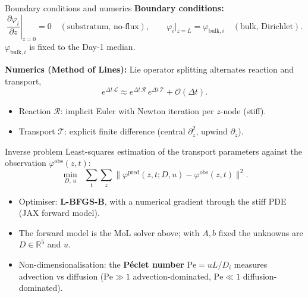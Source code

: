 \documentclass[
  ignorenonframetext,
  aspectratio=169,
]{beamer}
\providecommand{\tightlist}{%
  \setlength{\itemsep}{0pt}\setlength{\parskip}{0pt}}
\begin{document}
\begin{frame}{Boundary conditions and numerics}
\protect\hypertarget{boundary-conditions-and-numerics}{}
\textbf{Boundary conditions:}
\[\left.\frac{\partial \varphi_i}{\partial z}\right|_{z=0}=0\quad(\text{substratum, no-flux}),\qquad
\varphi_i\big|_{z=L}=\varphi_{\text{bulk},i}\quad(\text{bulk, Dirichlet}).\]
\(\varphi_{\text{bulk},i}\) is fixed to the Day-1 median.

\textbf{Numerics (Method of Lines):} Lie operator splitting alternates
reaction and transport,
\[e^{\Delta t\,\mathcal{L}} \approx e^{\Delta t\,\mathcal{R}}\,e^{\Delta t\,\mathcal{T}} + \mathcal{O}(\Delta t).\]

\begin{itemize}
\tightlist
\item
  Reaction \(\mathcal{R}\): implicit Euler with Newton iteration per
  \(z\)-node (stiff).
\item
  Transport \(\mathcal{T}\): explicit finite difference (central
  \(\partial_z^2\), upwind \(\partial_z\)).
\end{itemize}
\end{frame}

\begin{frame}{Inverse problem}
\protect\hypertarget{inverse-problem}{}
Least-squares estimation of the transport parameters against the
observation \(\varphi^{\text{obs}}(z,t)\):
\[\min_{D,\,u}\;\; \sum_t \sum_z
 \big\lVert \varphi^{\text{pred}}(z,t;D,u) - \varphi^{\text{obs}}(z,t)\big\rVert^2 .\]

\begin{itemize}
\tightlist
\item
  Optimiser: \textbf{L-BFGS-B}, with a numerical gradient through the
  stiff PDE (JAX forward model).
\item
  The forward model is the MoL solver above; with \(A,b\) fixed the
  unknowns are \(D\in\mathbb{R}^5\) and \(u\).
\item
  Non-dimensionalisation: the \textbf{Péclet number}
  \(\mathrm{Pe} = uL/D_i\) measures advection vs diffusion
  (\(\mathrm{Pe}\gg1\) advection-dominated, \(\mathrm{Pe}\ll1\)
  diffusion-dominated).
\end{itemize}
\end{frame}
\end{document}
